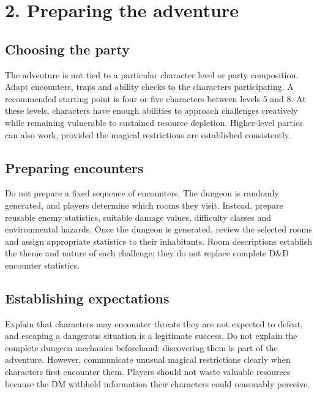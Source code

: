 \section{2. Preparing the adventure}

\subsection{Choosing the party}

The adventure is not tied to a particular character level or party composition. Adapt encounters, traps and ability checks to the characters participating. A recommended starting point is four or five characters between levels 5 and 8. At these levels, characters have enough abilities to approach challenges creatively while remaining vulnerable to sustained resource depletion. Higher-level parties can also work, provided the magical restrictions are established consistently.

\subsection{Preparing encounters}

Do not prepare a fixed sequence of encounters. The dungeon is randomly generated, and players determine which rooms they visit. Instead, prepare reusable enemy statistics, suitable damage values, difficulty classes and environmental hazards. Once the dungeon is generated, review the selected rooms and assign appropriate statistics to their inhabitants. Room descriptions establish the theme and nature of each challenge; they do not replace complete D\&D encounter statistics.

\subsection{Establishing expectations}

Explain that characters may encounter threats they are not expected to defeat, and escaping a dangerous situation is a legitimate success. Do not explain the complete dungeon mechanics beforehand: discovering them is part of the adventure. However, communicate unusual magical restrictions clearly when characters first encounter them. Players should not waste valuable resources because the DM withheld information their characters could reasonably perceive.
